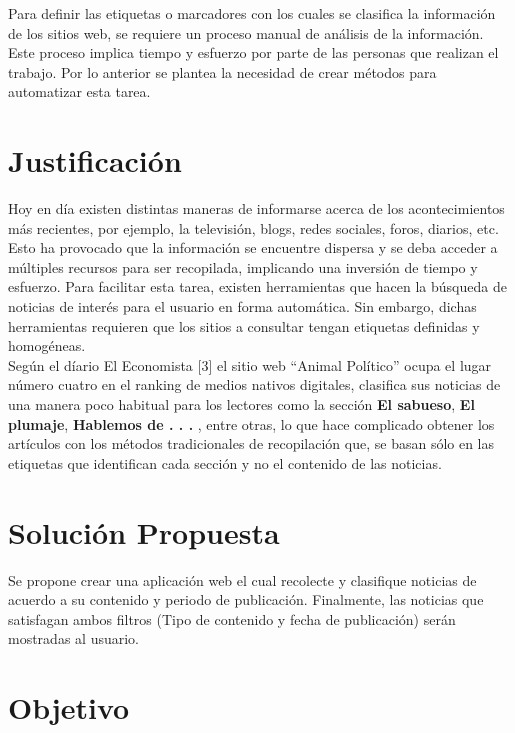 Para definir las etiquetas o marcadores con los cuales se clasifica la información de los sitios web, se requiere un proceso manual de análisis de la información. Este proceso implica tiempo y esfuerzo por parte de las personas que realizan el trabajo. Por lo anterior se plantea la necesidad de crear métodos para automatizar esta tarea. 

\section{Justificación}



Hoy en día existen distintas maneras de informarse acerca de los acontecimientos más recientes, por ejemplo, la televisión, blogs, redes sociales, foros,
diarios, etc. Esto ha provocado que la información se encuentre dispersa y
se deba acceder a múltiples recursos para ser recopilada, implicando
una inversión de tiempo y esfuerzo. Para facilitar esta tarea, existen herramientas
que hacen la búsqueda de noticias de interés para el usuario en forma automática. Sin embargo, dichas herramientas requieren que los sitios a consultar tengan etiquetas definidas y homogéneas.\\

Según el díario El Economista [3] el sitio web “Animal Político”
ocupa el lugar número cuatro en el ranking de medios nativos digitales, clasifica sus noticias de una manera poco habitual para los lectores como la sección
\textbf{El sabueso}, \textbf{El plumaje}, \textbf{Hablemos de . . . }, entre otras, lo que hace complicado obtener los artículos con los métodos tradicionales de recopilación que,
se basan sólo en las etiquetas que identifican cada sección y no el contenido de
las noticias.


\section{Solución Propuesta}

Se propone crear una aplicación web el cual recolecte y clasifique noticias de acuerdo 
a su contenido y periodo de publicación. Finalmente, las noticias
que satisfagan ambos filtros (Tipo de contenido y fecha de publicación) serán mostradas al usuario.

\section{Objetivo}

